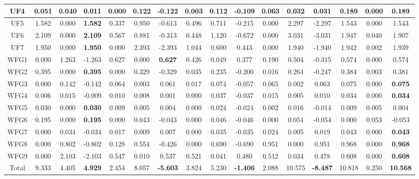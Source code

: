 \begin{table}[t]
{\begin{tabular}{c|c|c|c|c|c|c|c|c|c|c|c|c|c|c|c}
UF4 & 0.051 & 0.040 & 0.011 & 0.000 & 0.122 & -0.122 & 0.003 & 0.112 & -0.109 & 0.063 & 0.032 & 0.031 & 0.189 & 0.000 & \textbf{0.189} \\ \hline
UF5 & 1.582 & 0.000 & \textbf{1.582} & 0.337 & 0.950 & -0.613 & 0.496 & 0.711 & -0.215 & 0.000 & 2.297 & -2.297 & 1.543 & 0.000 & 1.543 \\ \hline
UF6 & 2.109 & 0.000 & \textbf{2.109} & 0.567 & 0.881 & -0.313 & 0.448 & 1.120 & -0.672 & 0.000 & 3.031 & -3.031 & 1.947 & 0.040 & 1.907 \\ \hline
UF7 & 1.950 & 0.000 & \textbf{1.950} & 0.000 & 2.393 & -2.393 & 1.044 & 0.600 & 0.443 & 0.000 & 1.940 & -1.940 & 1.942 & 0.002 & 1.939 \\ \hline
WFG1 & 0.000 & 1.263 & -1.263 & 0.627 & 0.000 & \textbf{0.627} & 0.426 & 0.049 & 0.377 & 0.190 & 0.504 & -0.315 & 0.574 & 0.000 & 0.574 \\ \hline
WFG2 & 0.395 & 0.000 & \textbf{0.395} & 0.000 & 0.329 & -0.329 & 0.035 & 0.235 & -0.200 & 0.016 & 0.264 & -0.247 & 0.384 & 0.003 & 0.381 \\ \hline
WFG3 & 0.000 & 0.142 & -0.142 & 0.064 & 0.003 & 0.061 & 0.017 & 0.074 & -0.057 & 0.065 & 0.002 & 0.063 & 0.075 & 0.000 & \textbf{0.075} \\ \hline
WFG4 & 0.006 & 0.015 & -0.009 & 0.010 & 0.008 & 0.001 & 0.000 & 0.037 & -0.037 & 0.015 & 0.005 & 0.010 & 0.034 & 0.000 & \textbf{0.034} \\ \hline
WFG5 & 0.030 & 0.000 & \textbf{0.030} & 0.009 & 0.005 & 0.004 & 0.000 & 0.024 & -0.024 & 0.002 & 0.016 & -0.014 & 0.009 & 0.005 & 0.004 \\ \hline
WFG6 & 0.195 & 0.000 & \textbf{0.195} & 0.000 & 0.043 & -0.043 & 0.000 & 0.046 & -0.046 & 0.000 & 0.054 & -0.054 & 0.000 & 0.053 & -0.053 \\ \hline
WFG7 & 0.000 & 0.034 & -0.034 & 0.017 & 0.009 & 0.007 & 0.000 & 0.035 & -0.035 & 0.024 & 0.005 & 0.019 & 0.043 & 0.000 & \textbf{0.043} \\ \hline
WFG8 & 0.000 & 0.802 & -0.802 & 0.128 & 0.554 & -0.426 & 0.000 & 0.690 & -0.690 & 0.951 & 0.000 & 0.951 & 0.968 & 0.000 & \textbf{0.968} \\ \hline
WFG9 & 0.000 & 2.103 & -2.103 & 0.547 & 0.010 & 0.537 & 0.521 & 0.041 & 0.480 & 0.512 & 0.034 & 0.478 & 0.608 & 0.000 & \textbf{0.608} \\ \hline
Total & 9.333 & 4.405 & \textbf{4.929} & 2.454 & 8.057 & \textbf{-5.603} & 3.824 & 5.230 & \textbf{-1.406} & 2.088 & 10.575 & \textbf{-8.487} & 10.818 & 0.250 & \textbf{10.568} \\ \hline
\end{tabular}%
}
\end{table}

